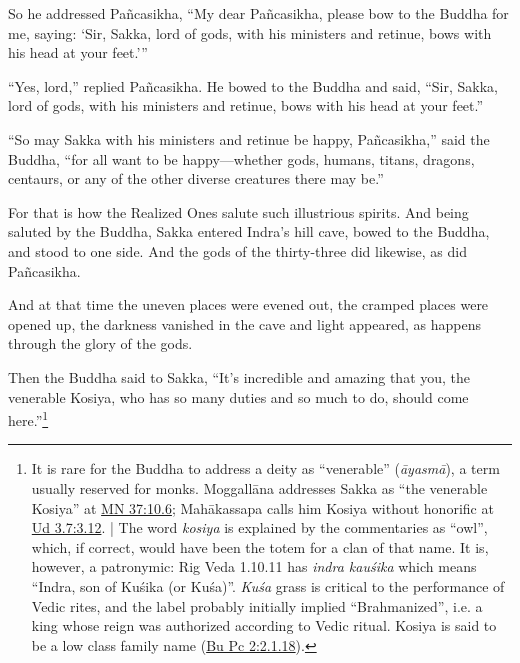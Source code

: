 \documentclass[12pt,openany]{book}%
\begin{document}
So he addressed \textsanskrit{Pañcasikha}, “My dear \textsanskrit{Pañcasikha}, please bow to the Buddha for me, saying: ‘Sir, Sakka, lord of gods, with his ministers and retinue, bows with his head at your feet.’” 

“Yes, lord,” replied \textsanskrit{Pañcasikha}. He bowed to the Buddha and said, “Sir, Sakka, lord of gods, with his ministers and retinue, bows with his head at your feet.” 

“So may Sakka with his ministers and retinue be happy, \textsanskrit{Pañcasikha},” said the Buddha, “for all want to be happy—whether gods, humans, titans, dragons, centaurs, or any of the other diverse creatures there may be.” 

For that is how the Realized Ones salute such illustrious spirits. And being saluted by the Buddha, Sakka entered Indra’s hill cave, bowed to the Buddha, and stood to one side. And the gods of the thirty-three did likewise, as did \textsanskrit{Pañcasikha}. 

And at that time the uneven places were evened out, the cramped places were opened up, the darkness vanished in the cave and light appeared, as happens through the glory of the gods. 

Then the Buddha said to Sakka, “It’s incredible and amazing that you, the venerable Kosiya, who has so many duties and so much to do, should come here.”\footnote{It is rare for the Buddha to address a deity as “venerable” (\textit{\textsanskrit{āyasmā}}), a term usually reserved for monks. \textsanskrit{Moggallāna} addresses Sakka as “the venerable Kosiya” at \href{https://suttacentral.net/mn37/en/sujato\#10.6}{MN 37:10.6}; \textsanskrit{Mahākassapa} calls him Kosiya without honorific at \href{https://suttacentral.net/ud3.7/en/sujato\#3.12}{Ud 3.7:3.12}. | The word \textit{kosiya} is explained by the commentaries as “owl”, which, if correct, would have been the totem for a clan of that name. It is, however, a patronymic: Rig Veda 1.10.11 has \textit{indra \textsanskrit{kauśika}} which means “Indra, son of \textsanskrit{Kuśika} (or \textsanskrit{Kuśa})”. \textit{\textsanskrit{Kuśa}} grass is critical to the performance of Vedic rites, and the label probably initially implied “Brahmanized”, i.e. a king whose reign was authorized according to Vedic ritual. Kosiya is said to be a low class family name (\href{https://suttacentral.net/pli-tv-bu-vb-pc2/en/sujato\#2.1.18}{Bu Pc 2:2.1.18}). } 
\end{document}
